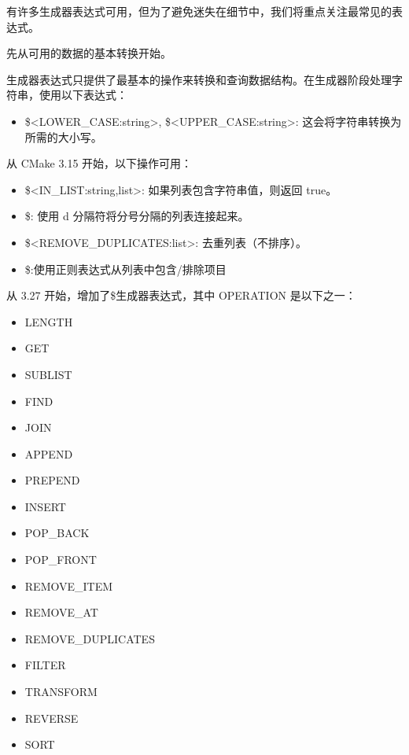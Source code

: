 
有许多生成器表达式可用，但为了避免迷失在细节中，我们将重点关注最常见的表达式。

先从可用的数据的基本转换开始。


生成器表达式只提供了最基本的操作来转换和查询数据结构。在生成器阶段处理字符串，使用以下表达式：

\begin{itemize}
\item
\$<LOWER\_CASE:string>, \$<UPPER\_CASE:string>: 这会将字符串转换为所需的大小写。
\end{itemize}

从 CMake 3.15 开始，以下操作可用：

\begin{itemize}
\item
\$<IN\_LIST:string,list>: 如果列表包含字符串值，则返回 true。

\item
\$<JOIN:list,d>: 使用 d 分隔符将分号分隔的列表连接起来。

\item
\$<REMOVE\_DUPLICATES:list>: 去重列表（不排序）。

\item
\$<FILTER:list,INCLUDE|EXCLUDE,regex>:使用正则表达式从列表中包含/排除项目
\end{itemize}

从 3.27 开始，增加了\$<LIST:OPERATION>生成器表达式，其中 OPERATION 是以下之一：

\begin{itemize}
\item
LENGTH

\item
GET

\item
SUBLIST

\item
FIND

\item
JOIN

\item
APPEND

\item
PREPEND

\item
INSERT

\item
POP\_BACK

\item
POP\_FRONT

\item
REMOVE\_ITEM

\item
REMOVE\_AT

\item
REMOVE\_DUPLICATES

\item
FILTER

\item
TRANSFORM

\item
REVERSE

\item
SORT
\end{itemize}

